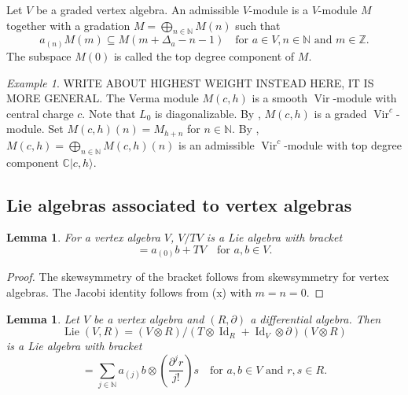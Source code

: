 \documentclass[a4paper, 12pt, reqno]{amsart}
\newtheorem{lemma}[theorem]{Lemma}
\theoremstyle{remark}
\newtheorem{example}[theorem]{Example}
\numberwithin{equation}{subsection}
\DeclareMathOperator{\Vir}{Vir}
\DeclareMathOperator{\Id}{Id}
\DeclareMathOperator{\Lie}{Lie}
\begin{document}
Let $V$ be a graded vertex algebra.
An admissible $V$-module is a $V$-module $M$ together with a gradation $M = \bigoplus_{n \in \mathbb{N}}M(n)$ such that
\begin{equation*}
  a_{(n)}M(m) \subseteq M(m + \Delta_a - n - 1) \quad \text{for }a \in V, n \in \mathbb{N}\text{ and }m \in \mathbb{Z}.
\end{equation*}
The subspace $M(0)$ is called the top degree component of $M$.

\begin{example}
  \label{exa:13}
  WRITE ABOUT HIGHEST WEIGHT INSTEAD HERE, IT IS MORE GENERAL.
  The Verma module $M(c, h)$ is a smooth $\Vir$-module with central charge $c$.
  Note that $L_0$ is diagonalizable.
  By , $M(c, h)$ is a graded $\Vir^c$-module.
  Set $M(c, h)(n) = M_{h + n}$ for $n \in \mathbb{N}$.
  By , $M(c, h) = \bigoplus_{n \in \mathbb{N}}M(c, h)(n)$ is an admissible $\Vir^c$-module with top degree component $\mathbb{C}|c, h\rangle$.
\end{example}

\subsection{Lie algebras associated to vertex algebras}
\label{sec:lie-algebr-assoc}

\begin{lemma}
  \label{lmm:8}
  For a vertex algebra $V$, $V/TV$ is a Lie algebra with bracket
  \begin{equation*}
    [a + TV, b + TV] = a_{(0)}b + TV \quad \text{for }a, b \in V.
  \end{equation*}
\end{lemma}

\begin{proof}
  The skewsymmetry of the bracket follows from skewsymmetry for vertex algebras.
  The Jacobi identity follows from (x) with $m = n = 0$.
\end{proof}

\begin{lemma}
  \label{lmm:9}
  Let $V$ be a vertex algebra and $(R, \partial)$ a differential algebra.
  Then
  \begin{equation*}
    \Lie(V, R) = (V \otimes R)/(T\otimes\Id_R + \Id_V\otimes\partial)(V \otimes R)
  \end{equation*}
  is a Lie algebra with bracket
  \begin{equation*}
    [a\otimes r, b\otimes s] = \sum_{j \in \mathbb{N}}a_{(j)}b\otimes\left(\frac{\partial^jr}{j!}\right)s \quad \text{for }a, b \in V\text{ and }r, s \in R.
  \end{equation*}
\end{lemma}
\end{document}
